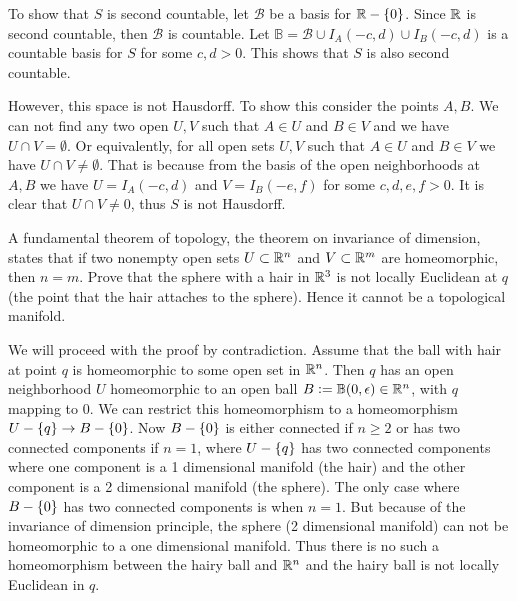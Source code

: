\begin{solution}
\begin{enumerate}[(a)]
		To show that $ S $ is second countable, let $ \mathcal{B} $ be a basis for $ \mathbb{R} - \{0\} $. Since $ \mathbb{R} $ is second countable, then $ \mathcal{B} $ is countable. Let $ \mathbb{B} = \mathcal{B} \cup I_A(-c,d) \cup I_B(-c,d) $ is a countable basis for $ S $ for some $ c,d > 0 $. This shows that $ S $ is also second countable.
		
		However, this space is not Hausdorff. To show this consider the points $ A,B $. We can not find any two open $ U,V $ such that $ A \in U $ and $ B \in V $ and we have $ U \cap V = \emptyset $. Or equivalently, for all open sets $ U,V $  such that $ A \in U $ and $ B \in V $ we have $ U\cap V \neq \emptyset $. That is because from the basis of the open neighborhoods at $ A,B $ we have $ U = I_A(-c,d) $ and $ V = I_B(-e,f) $ for some $ c,d,e,f > 0 $. It is clear that $ U \cap V \neq 0 $, thus $ S $ is not Hausdorff.
	\end{enumerate}
\end{solution}

\begin{problem} 
	A fundamental theorem of topology, the theorem on invariance of dimension, states that if two nonempty open sets $ U \subset \mathbb{R}^n $ and $ V \subset \mathbb{R}^m $ are homeomorphic, then $ n = m $. Prove that the sphere with a hair in $ \mathbb{R}^3 $ is not locally Euclidean at $ q $ (the point that the hair attaches to the sphere). Hence it cannot be a topological manifold. 
\end{problem}

\begin{solution}
	We will proceed with the proof by contradiction. Assume that the ball with hair at  point $ q $ is homeomorphic to some open set in $ \mathbb{R}^n $. Then $ q $ has an open neighborhood $ U $ homeomorphic to an open ball $ B := \mathbb{B}(0,\epsilon) \in \mathbb{R}^n $, with $ q $ mapping to 0. We can restrict this homeomorphism to a homeomorphism $ U - \{q\} \to B - \{0\} $. Now $ B-\{0\} $ is either connected if $ n \geq 2 $ or has two connected components if $ n=1 $, where $ U - \{q\} $ has two connected components where one component is a 1 dimensional manifold (the hair) and the other component is a 2 dimensional manifold (the sphere). The only case where $ B - \{0\} $ has two connected components is when $ n = 1 $. But because of the invariance of dimension principle, the sphere (2 dimensional manifold) can not be homeomorphic to a one dimensional manifold. Thus there is no such a homeomorphism between the hairy ball and $ \mathbb{R}^n $ and the hairy ball is not locally Euclidean in $ q $.
\end{solution}

